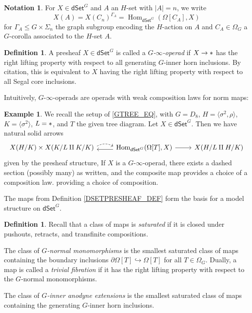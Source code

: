 \documentclass[a4paper,10pt
,draft
]{article}%
\numberwithin{equation}{section}
\numberwithin{figure}{section}
\theoremstyle{definition} %
\newtheorem{definition}[equation]{Definition}%
\newtheorem{example}[equation]{Example}%
\newtheorem{notation}[equation]{Notation}%
\newcommand{\into}{\hookrightarrow}%
\newcommand{\dSet}{\mathsf{dSet}}
\DeclareMathOperator{\Hom}{Hom}%
\newcommand{\1}{\ensuremath{\mathbbm 1}}%
\begin{document}
\begin{notation}
      For $X \in \dSet^G$ and $A$ an $H$-set with $|A|=n$, we write
      \[
            X(A) = X(C_n)^{\Gamma_A} = \Hom_{\dSet^G}(\Omega[C_A],X)
      \]
      for $\Gamma_A \leq G \times \Sigma_n$ the graph subgroup encoding the $H$-action on $A$ and
      $C_A \in \Omega_G$ a $G$-corolla associated to the $H$-set $A$.
\end{notation}

\begin{definition}
      A presheaf $X \in \dSet^G$ is called a \textit{$G$-$\infty$-operad} if $X \to \**$ has the right lifting property with respect to all generating $G$-inner horn inclusions.
      By {\color{blue} citation}, this is equivalent to $X$ having the right lifting property with respect to all Segal core inclusions.
\end{definition}
Intuitively,
$G$-$\infty$-operads are operads with weak composition laws for norm maps:
\begin{example}
      We recall the setup of \eqref{GTREE_EQ}, with $G = D_8$, $H = \langle \sigma^2,\rho \rangle$, $K = \langle \sigma^2 \rangle$, $L = \**$, and $T$ the given tree diagram.
      Let $X \in \dSet^G$. Then we have natural solid arrows
      \[
            \begin{tikzcd}
                  X(H/K) \times X(K/L \amalg K/K) \arrow[r, start anchor = east, end anchor = west, dashed, bend left, shift left]
                  &
                  \Hom_{\dSet^G}(\Omega[T], X) \arrow[l, shift left] \arrow[r]
                  &
                  X(H/L \amalg H/K)
            \end{tikzcd}
      \]
      given by the presheaf structure,
      If $X$ is a $G$-$\infty$-operad, there exists a dashed section (possibly many) as written,
      and the composite map provides a choice of a composition law.
      providing a choice of composition.     
\end{example}





The maps from Definition \ref{DSETPRESHEAF_DEF} form the basis for a model structure on $\dSet^G$.

\begin{definition}
      Recall that a class of maps is \textit{saturated} if it is closed under pushouts, retracts, and transfinite compositions.
      
      The class of \textit{$G$-normal monomorphisms}
      is the smallest saturated class of maps containing the boundary inclusions $\partial \Omega[T] \into \Omega[T]$ for all $T \in \Omega_G$.
      Dually, a map is called a \textit{trivial fibration} if it has the right lifting property with respect to the $G$-normal monomorphisms.
      
      The class of \textit{$G$-inner anodyne extensions} is the smallest saturated class of maps containing the generating $G$-inner horn inclusions.
\end{definition}
\end{document}
